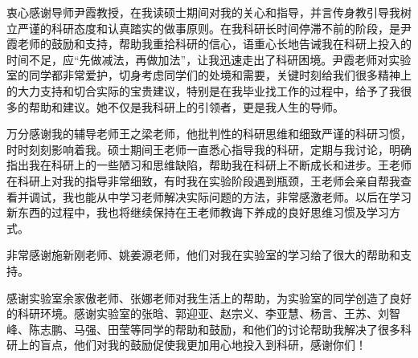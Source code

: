\begin{acknowledgement}
  衷心感谢导师尹霞教授，在我读硕士期间对我的关心和指导，并言传身教引导我树立严谨的科研态度和认真踏实的做事原则。在我科研长时间停滞不前的阶段，是尹霞老师的鼓励和支持，帮助我重拾科研的信心，语重心长地告诫我在科研上投入的时间不足，应“先做减法，再做加法”，让我迅速走出了科研困境。尹霞老师对实验室的同学都非常爱护，切身考虑同学们的处境和需要，关键时刻给我们很多精神上的大力支持和切合实际的宝贵建议，特别是在我毕业找工作的过程中，给予了我很多的帮助和建议。她不仅是我科研上的引领者，更是我人生的导师。

  万分感谢我的辅导老师王之梁老师，他批判性的科研思维和细致严谨的科研习惯，时时刻刻影响着我。硕士期间王老师一直悉心指导我的科研，定期与我讨论，明确指出我在科研上的一些陋习和思维缺陷，帮助我在科研上不断成长和进步。王老师在科研上对我的指导非常细致，有时我在实验阶段遇到瓶颈，王老师会亲自帮我查看并调试，我也能从中学习老师解决实际问题的方法，非常感激老师。以后在学习新东西的过程中，我也将继续保持在王老师教诲下养成的良好思维习惯及学习方式。

  非常感谢施新刚老师、姚姜源老师，他们对我在实验室的学习给了很大的帮助和支持。

  感谢实验室余家傲老师、张娜老师对我生活上的帮助，为实验室的同学创造了良好的科研环境。感谢实验室的张晗、郭迎亚、赵宗义、李亚慧、杨言、王苏、刘智峰、陈志鹏、马强、田莹等同学的帮助和鼓励，和他们的讨论帮助我解决了很多科研上的盲点，他们对我的鼓励促使我更加用心地投入到科研，感谢你们！


\end{acknowledgement}
